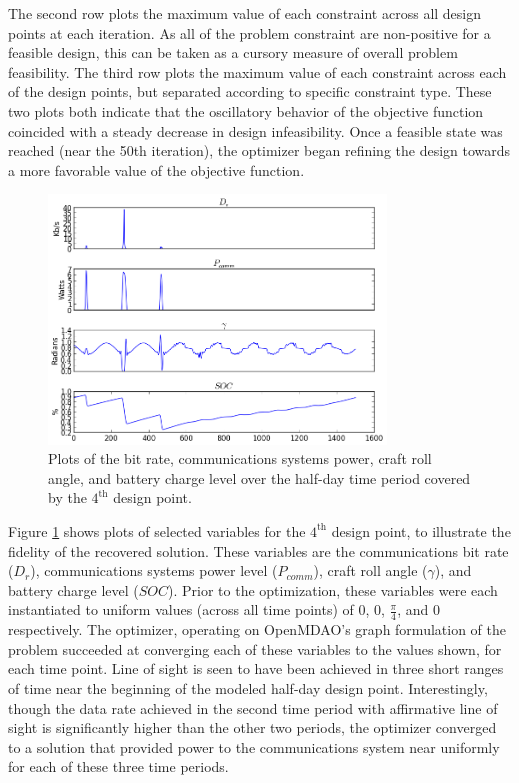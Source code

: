 \documentclass[]{aiaa-tc} %
\begin{document}
The second row plots the maximum value of each constraint across all design points at
each iteration. As all of the problem constraint are non-positive for a feasible design,
this can be taken as a cursory measure of overall problem feasibility.
The third row plots the maximum value of each constraint across each of the design points,
but separated according to specific constraint type. These two plots both indicate that the
oscillatory behavior of the objective function coincided with a steady decrease in design
infeasibility. Once a feasible state was reached (near the 50th iteration), the optimizer
began refining the design towards a more favorable value of the objective function.

\begin{figure}
\centering
\includegraphics[width=0.8\textwidth]{images/pt_3_data.png}
\caption[width=0.4\textwidth]{Plots of the bit rate, communications systems power, craft roll angle,
and battery charge level over the half-day time period covered by the $4^{\textrm{th}}$ design point.}
\label{pt3_data_results}
\end{figure}

Figure \ref{pt3_data_results} shows plots of selected variables for the $4^{\textrm{th}}$ design point,
to illustrate the fidelity of the recovered solution. These variables are the communications bit rate ($D_r$), communications systems power level ($P_{comm}$), craft roll angle ($\gamma$),
and battery charge level ($SOC$). Prior to the optimization, these variables
were each instantiated to uniform values
(across all time points) of 0, 0, $\frac{\pi}{4}$, and 0 respectively. The optimizer, operating on
OpenMDAO's graph formulation of the problem succeeded at converging each of these variables to the values
shown, for each time point. Line of sight is seen to have been achieved in three short ranges of time near the
beginning of the modeled half-day design point. Interestingly, though the data rate achieved in the second
time period with affirmative line of sight is significantly higher than the other two periods, the optimizer
converged to a solution that provided power to the communications system near uniformly for each of these
three time periods.
\end{document}
